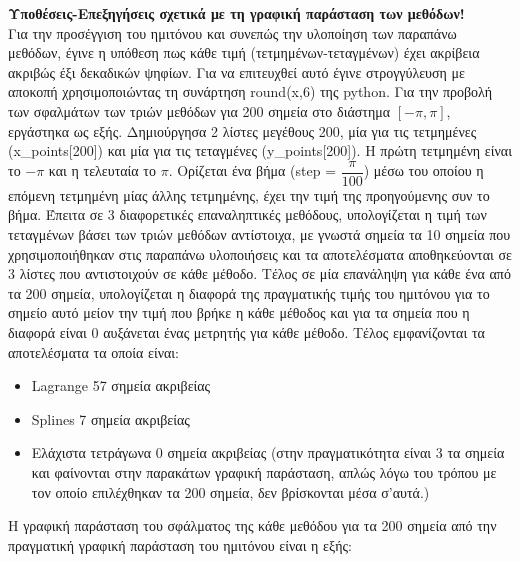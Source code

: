 \documentclass{article}
\begin{document}
\par\textbf{Υποθέσεις-Επεξηγήσεις σχετικά με τη γραφική παράσταση των μεθόδων!}\\
Για την προσέγγιση του ημιτόνου και συνεπώς την υλοποίηση των παραπάνω μεθόδων, έγινε η υπόθεση πως
κάθε τιμή (τετμημένων-τεταγμένων) έχει ακρίβεια ακριβώς έξι δεκαδικών ψηφίων. Για να επιτευχθεί αυτό έγινε στρογγύλευση με αποκοπή χρησιμοποιώντας τη συνάρτηση round(x,6) της python. Για την προβολή των σφαλμάτων των τριών μεθόδων για 200 σημεία στο διάστημα $[-\pi, \pi]$, εργάστηκα ως εξής. Δημιούργησα 2 λίστες μεγέθους 200, μία για τις τετμημένες (x\_points[200]) και μία για τις τεταγμένες (y\_points[200]). Η πρώτη τετμημένη είναι το $-\pi$ και η τελευταία το $\pi$. Ορίζεται ένα βήμα (step = $\dfrac{\pi}{100}$) μέσω του οποίου η επόμενη τετμημένη μίας άλλης τετμημένης, έχει την τιμή της προηγούμενης συν το βήμα. Έπειτα σε 3 διαφορετικές επαναληπτικές μεθόδους, υπολογίζεται η τιμή των τεταγμένων βάσει των τριών μεθόδων αντίστοιχα, με γνωστά σημεία τα 10 σημεία που χρησιμοποιήθηκαν στις παραπάνω υλοποιήσεις και τα αποτελέσματα αποθηκεύονται σε 3 λίστες που αντιστοιχούν σε κάθε μέθοδο. Τέλος σε μία επανάληψη για κάθε ένα από τα 200 σημεία, υπολογίζεται η διαφορά της πραγματικής τιμής του ημιτόνου για το σημείο αυτό μείον την τιμή που βρήκε η κάθε μέθοδος και για τα σημεία που η διαφορά είναι 0 αυξάνεται ένας μετρητής για κάθε μέθοδο. Τέλος εμφανίζονται τα αποτελέσματα τα οποία είναι:\\
\begin{itemize}
    \item Lagrange  57 σημεία ακριβείας
    \item Splines 7 σημεία ακριβείας
    \item Ελάχιστα τετράγωνα  0 σημεία ακριβείας (στην πραγματικότητα είναι 3 τα σημεία και φαίνονται στην παρακάτων γραφική παράσταση, απλώς λόγω του τρόπου με τον οποίο επιλέχθηκαν τα 200 σημεία, δεν βρίσκονται μέσα σ'αυτά.)
\end{itemize}

Η γραφική παράσταση του σφάλματος της κάθε μεθόδου για τα 200 σημεία από την πραγματική γραφική παράσταση του ημιτόνου είναι η εξής: \\
\end{document}
